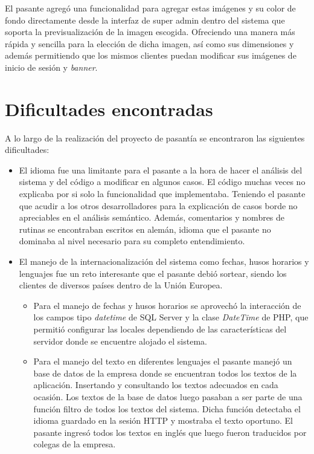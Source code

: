 	El pasante agregó una funcionalidad para agregar estas imágenes y su color de fondo directamente desde la interfaz de super admin dentro del sistema que soporta la previsualización de la imagen escogida. Ofreciendo una manera más rápida y sencilla para la elección de dicha imagen, así como sus dimensiones y además permitiendo que los mismos clientes puedan modificar sus imágenes de inicio de sesión y \emph{banner}. 


\section{Dificultades encontradas} %
\label{sec:dificultades_encontradas}

A lo largo de la realización del proyecto de pasantía se encontraron las siguientes dificultades:

\begin{itemize}
	\item El idioma fue una limitante para el pasante a la hora de hacer el análisis del sistema y del código a modificar en algunos casos. El código muchas veces no explicaba por si solo la funcionalidad que implementaba. Teniendo el pasante que acudir a los otros desarrolladores para la explicación de casos borde no apreciables en el análisis semántico. Además, comentarios y nombres de rutinas se encontraban escritos en alemán, idioma que el pasante no dominaba al nivel necesario para su completo entendimiento.

	\item El manejo de la internacionalización del sistema como fechas, husos horarios y lenguajes fue un reto interesante que el pasante debió sortear, siendo los clientes de diversos países dentro de la Unión Europea. 
	
	\begin{itemize}
		\item Para el manejo de fechas y husos horarios se aprovechó la interacción de los campos tipo \emph{datetime} de SQL Server y la clase \emph{DateTime} de PHP, que permitió configurar las locales dependiendo de las características del servidor donde se encuentre alojado el sistema.

		\item Para el manejo del texto en diferentes lenguajes el pasante manejó un base de datos de la empresa donde se encuentran todos los textos de la aplicación. Insertando y consultando los textos adecuados en cada ocasión. Los textos de la base de datos luego pasaban a ser parte de una función filtro de todos los textos del sistema. Dicha función detectaba el idioma guardado en la sesión \gls{HTTP} y mostraba el texto oportuno. El pasante ingresó todos los textos en inglés que luego fueron traducidos por colegas de la empresa.
	\end{itemize}

\end{itemize}




